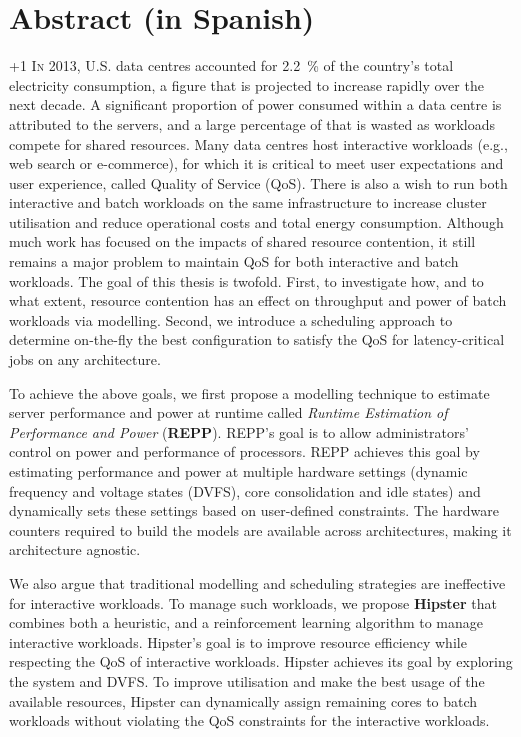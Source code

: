 \chapter*{Abstract (in Spanish)}

    \looseness +1 \lettrine{I}{n} 2013, U.S. data centres accounted for \SI{2.2}{\percent}
    of the country's total electricity consumption, a figure that is projected to increase
    rapidly over the next decade.  A significant proportion of power consumed within a
    data centre is attributed to the servers, and a large percentage of that is wasted as
    workloads compete for shared resources.  Many data centres host interactive workloads
    (e.g., web search or e-commerce), for which it is critical to meet user expectations
    and user experience, called Quality of Service (QoS).  There is also a wish to run
    both interactive and batch workloads on the same infrastructure to increase cluster
    utilisation and reduce operational costs and total energy consumption. Although much
    work has focused on the impacts of shared resource contention, it still remains a
    major problem to maintain QoS for both interactive and batch workloads. The goal of
    this thesis is twofold. First, to investigate how, and to what extent, resource
    contention has an effect on throughput and power of batch workloads via modelling.
    Second, we introduce a scheduling approach to determine on-the-fly the best
    configuration to satisfy the QoS for latency-critical jobs on any architecture.
     
     To achieve the above goals, we first propose a modelling technique to
    estimate server performance and power at runtime called \emph{Runtime Estimation of
    Performance and Power} (\textbf{REPP}).  REPP's goal is to allow administrators'
    control on power and performance of processors.  REPP achieves this goal by estimating
    performance and power at multiple hardware settings (dynamic frequency and voltage
    states (DVFS), core consolidation and idle states) and dynamically sets these settings
    based on user-defined constraints.  The hardware counters required to build the models
    are available across architectures, making it architecture agnostic.
    
     We also argue that traditional modelling and scheduling strategies are
    ineffective for interactive workloads. To manage such workloads, we propose
    \textbf{Hipster} that combines both a heuristic, and a reinforcement learning
    algorithm to manage interactive workloads.  Hipster's goal is to improve resource
    efficiency while respecting the QoS of interactive workloads.  Hipster achieves its
    goal by exploring the \muc system and DVFS. To improve utilisation and make the best
    usage of the available resources, Hipster can dynamically assign remaining cores to
    batch workloads without violating the QoS constraints for the interactive workloads. 


